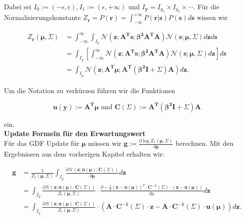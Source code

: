 \documentclass[12pt,a4paper]{scrartcl}
\numberwithin{equation}{section}
\begin{document}
Dabei sei $I_0 := (- \epsilon,\epsilon), I_1 := (\epsilon,+ \infty)$ und $I_{\mathbf{y}} = I_{y_1} \times I_{y_2} \times \cdots$. Für die Normalisierungskonstante $Z_{\mathbf{r}} = P(\mathbf{r}) = \int_{- \infty}^{+ \infty} P(\mathbf{r}|\mathbf{s}) P(\mathbf{s}) d \mathbf{s}$ wissen wir

\begin{equation}
\begin{split}
 Z_{\mathbf{r}}(\mathbf{\mu}, \mathbf{\varSigma}) &= \int_{- \infty}^{\infty} \int_{I_y} \mathcal{N}(\mathbf{z;A^Ts; \beta^2 A^T A}) \mathcal{N}(\mathbf{s;\mu,\varSigma}) d \mathbf{z} d \mathbf{s} \\
 &= \int_{I_y} \left [ \int_{- \infty}^{\infty} \mathcal{N}(\mathbf{z;A^Ts; \beta^2 A^T A}) \mathcal{N}(\mathbf{s;\mu,\varSigma}) d \mathbf{z} \right ] d \mathbf{s} \\
 &= \int_{I_y} \mathcal{N}(\mathbf{z; A^T \mu; A^T (\beta^2 I + \varSigma) A}) d \mathbf{z}.
 \end{split}
 \end{equation}

Um die Notation zu verkürzen führen wir die Funktionen 

\begin{equation}
 \mathbf{u(y) := A^T \mu} \text{ und 	} \mathbf{C(\varSigma) := A^T (\beta^2 I + \varSigma) A}
\end{equation}

ein. \\ 

\textbf{Update Formeln für den Erwartungswert} \\

Für das GDF Update für $\mathbf{\mu}$ müssen wir $\mathbf{g} := \frac{ \partial \log{Z_r(\mathbf{\mu,\varSigma})}}{\partial \mathbf{\mu}}$ berechnen. Mit den Ergebnissen aus 
dem vorherigen Kapitel erhalten wir:

\begin{equation}
 \begin{split}
 \mathbf{g} &= \frac{1}{Z_r(\mathbf{\mu, \varSigma})} \int_{I_y} \frac{\partial \mathcal{N}(\mathbf{z;u(\mu); C(\varSigma)})}{\partial \mathbf{\mu}} d \mathbf{z} \\
 &= \int_{I_y} \frac{\partial \mathcal{N}(\mathbf{z;u(\mu); C(\varSigma)})}{Z_r(\mathbf{\mu, \varSigma})} \cdot \frac{\partial - \frac{1}{2} (\mathbf{z-u(\mu)})^T \cdot \mathbf{C^{-1}(\varSigma) \cdot (\mathbf{z-u(\mu)})}}{\partial \mu} d \mathbf{z} \\
 &= \int_{I_y} \frac{\partial \mathcal{N}(\mathbf{z;u(\mu); C(\varSigma)})}{Z_r(\mathbf{\mu, \varSigma})} \cdot (\mathbf{A \cdot C^{-1}(\varSigma) \cdot z - A \cdot C^{-1}(\varSigma) \cdot u(\mu)}) d \mathbf{z}. \\
 \end{split}
\end{equation}
\end{document}
